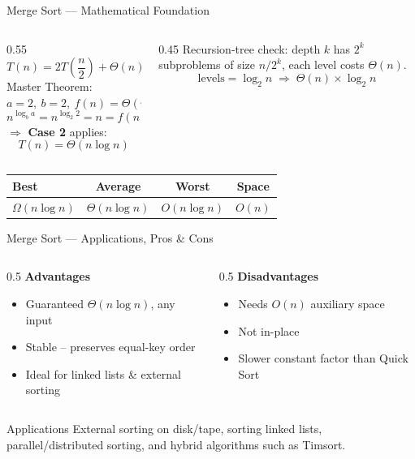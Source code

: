 \documentclass[9pt,aspectratio=169]{beamer}
\begin{document}
\begin{frame}{Merge Sort --- Mathematical Foundation}
\begin{columns}[T]
\begin{column}{0.55\textwidth}
\[
T(n) = 2T\!\left(\frac{n}{2}\right) + \Theta(n), \quad T(1)=\Theta(1)
\]
Master Theorem: \(a=2,\ b=2,\ f(n)=\Theta(n)\)
\[
n^{\log_b a} = n^{\log_2 2} = n = f(n)
\]
\(\Rightarrow\) \textbf{Case 2} applies:
\[
\boxed{T(n) = \Theta(n\log n)}
\]
\end{column}
\begin{column}{0.45\textwidth}
\small Recursion-tree check: depth $k$ has $2^k$ subproblems of size $n/2^k$, each level costs $\Theta(n)$.
\[
\text{levels} = \log_2 n \;\Rightarrow\; \Theta(n)\times\log_2 n
\]
\end{column}
\end{columns}
\vspace{3mm}
\begin{table}\small
\begin{tabular}{lccc}
\toprule
Best & Average & Worst & Space\\
\midrule
\(\Omega(n\log n)\) & \(\Theta(n\log n)\) & \(O(n\log n)\) & \(O(n)\)\\
\bottomrule
\end{tabular}
\end{table}
\end{frame}

\begin{frame}{Merge Sort --- Applications, Pros \& Cons}
\begin{columns}[T]
\begin{column}{0.5\textwidth}
\textbf{\color{teal}Advantages}
\begin{itemize}
  \item Guaranteed \(\Theta(n\log n)\), any input
  \item Stable -- preserves equal-key order
  \item Ideal for linked lists \& external sorting
\end{itemize}
\end{column}
\begin{column}{0.5\textwidth}
\textbf{\color{warnRed}Disadvantages}
\begin{itemize}
  \item Needs \(O(n)\) auxiliary space
  \item Not in-place
  \item Slower constant factor than Quick Sort
\end{itemize}
\end{column}
\end{columns}
\vspace{2mm}
\begin{block}{Applications}
\small External sorting on disk/tape, sorting linked lists, parallel/distributed sorting, and hybrid algorithms such as Timsort.
\end{block}
\end{frame}
\end{document}
